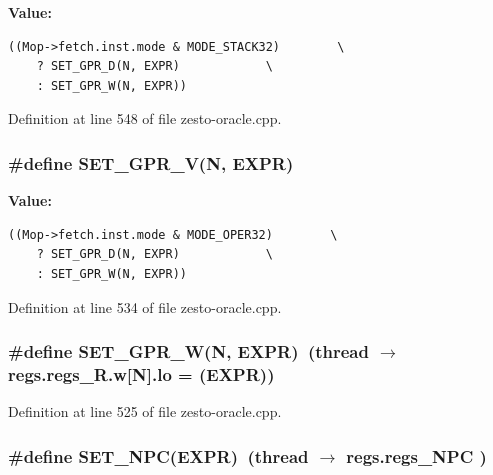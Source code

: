 \textbf{Value:}

\begin{Code}\begin{verbatim}((Mop->fetch.inst.mode & MODE_STACK32)        \
    ? SET_GPR_D(N, EXPR)            \
    : SET_GPR_W(N, EXPR))
\end{verbatim}
\end{Code}


Definition at line 548 of file zesto-oracle.cpp.
\subsubsection[{SET\_\-GPR\_\-V}]{\setlength{\rightskip}{0pt plus 5cm}\#define SET\_\-GPR\_\-V(N, \/  EXPR)}\label{zesto-oracle_8cpp_94ea2069d35ea9a6666a46dd573c310d}


\textbf{Value:}

\begin{Code}\begin{verbatim}((Mop->fetch.inst.mode & MODE_OPER32)        \
    ? SET_GPR_D(N, EXPR)            \
    : SET_GPR_W(N, EXPR))
\end{verbatim}
\end{Code}


Definition at line 534 of file zesto-oracle.cpp.
\subsubsection[{SET\_\-GPR\_\-W}]{\setlength{\rightskip}{0pt plus 5cm}\#define SET\_\-GPR\_\-W(N, \/  EXPR)~(thread $\rightarrow$ regs.regs\_\-R.w[N].lo = (EXPR))}\label{zesto-oracle_8cpp_94bc1db9dcc4e27b6f9dc9b181c1f188}




Definition at line 525 of file zesto-oracle.cpp.
\subsubsection[{SET\_\-NPC}]{\setlength{\rightskip}{0pt plus 5cm}\#define SET\_\-NPC(EXPR)~(thread $\rightarrow$ regs.regs\_\-NPC )}\label{zesto-oracle_8cpp_865b63e02a03e6220f36dfedfaf171f0}




